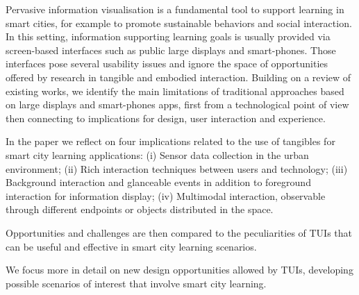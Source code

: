 Pervasive information visualisation is a fundamental tool to support learning in smart cities, for example to promote sustainable behaviors and social interaction. In this setting, information supporting learning goals is usually provided via screen-based interfaces such as public large displays and smart-phones. Those interfaces pose several usability issues and ignore the space of opportunities offered by research in tangible and embodied interaction.
Building on a review of existing works, we identify the main limitations of traditional approaches based on large displays and smart-phones apps, first from a technological point of view then connecting to implications for design, user interaction and experience.

In the paper we reflect on four implications related to the use of tangibles for smart city learning applications: (i) Sensor data collection in the urban environment; (ii) Rich interaction techniques between users and technology; (iii) Background interaction and glanceable events in addition to foreground interaction for information display; (iv) Multimodal interaction, observable through different endpoints or objects distributed in the space.

Opportunities and challenges are then compared to the peculiarities of TUIs that can be useful and effective in smart city learning scenarios.

We focus more in detail on new design opportunities allowed by TUIs, developing possible scenarios of interest that involve smart city learning.
